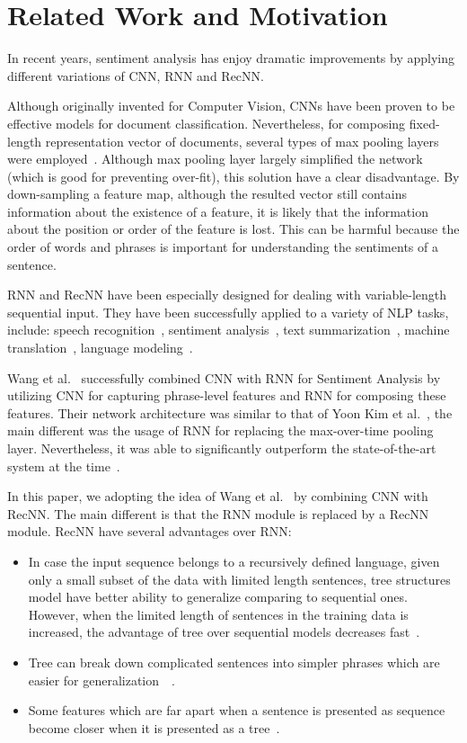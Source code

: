 \section{Related Work and Motivation}\label{sec:related}
In recent years, sentiment analysis has enjoy dramatic improvements by applying different variations of CNN, RNN and RecNN.

Although originally invented for Computer Vision, CNNs have been proven to be effective models for document classification.
Nevertheless, for composing fixed-length representation vector of documents, several types of max pooling layers were employed~\cite{nlp-scratch, KimCNN, DCNN, 2-layer-cnn}.
Although max pooling layer largely simplified the network (which is good for preventing over-fit), this solution have a clear disadvantage.
By down-sampling a feature map, although the resulted vector still contains information about the existence of a feature, it is likely that the information about the position or order of the feature is lost.
This can be harmful because the order of words and phrases is important for understanding the sentiments of a sentence.

RNN and RecNN have been especially designed for dealing with variable-length sequential input.
They have been successfully applied to a variety of NLP tasks, include: speech recognition~\cite{speech-lstm, MiaoGM15}, sentiment analysis~\cite{treeLSTM, attention-gru}, text summarization~\cite{RushCW15, NallapatiXZ16}, machine translation~\cite{FiratCB16, SutskeverVL14, BritzGLL17}, language modeling~\cite{mikolov-nlm, JozefowiczVSSW16}.

Wang et al.~\cite{cnn-rnn} successfully combined CNN with RNN for Sentiment Analysis by utilizing CNN for capturing phrase-level features and RNN for composing these features.
Their network architecture was similar to that of Yoon Kim et al.~\cite{KimCNN}, the main different was the usage of RNN for replacing the max-over-time pooling layer.
Nevertheless, it was able to significantly outperform the state-of-the-art system at the time~\cite{cnn-rnn}.

In this paper, we adopting the idea of Wang et al.~\cite{cnn-rnn} by combining CNN with RecNN.
The main different is that the RNN module is replaced by a RecNN module.
RecNN have several advantages over RNN:
\begin{itemize}
	\item In case the input sequence belongs to a recursively defined language, given only a small subset of the data with limited length sentences, tree structures model have better ability to generalize comparing to sequential ones.
	However, when the limited length of sentences in the training data is increased, the advantage of tree over sequential models decreases fast~\cite{bowman-treevslstm}.
	\item Tree can break down complicated sentences into simpler phrases which are easier for generalization~\cite{knowledge-matter}~\cite{need-tree}.
	\item Some features which are far apart when a sentence is presented as sequence become closer when it is presented as a tree~\cite{need-tree}.
\end{itemize}

